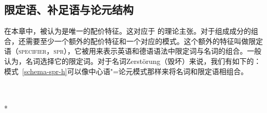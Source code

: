 \subsection{限定语、补足语与论元结构}
\label{Abschnitt-Arg-St}
\label{Abschnitt-Spr}

在本章中，\subcatc 被认为是唯一的配价特征。这对应于 的理论主张。对于组成成分的组合，还需要至少一个额外的配价特征和一个对应的模式。这个额外的特征叫做限定语（\textsc{specifier}，\textsc{spr}），它被用来表示英语\citep[\S~9]{ps2}和德语\citep[\S~9.3]{MuellerLehrbuch1}语法中限定词与名词的组合。一般认为，名词选择它的限定词。对于名词Zerstörung（毁坏）来说，我们有如下的\catvc：
\ea
{}
\z
模式~\ref{schema-spr-h}可以像中心语"=论元模式那样来将名词和限定语相组合。
\begin{schema}
\label{schema-spr-h}
~\\
 \impl\\*
\end{schema}
